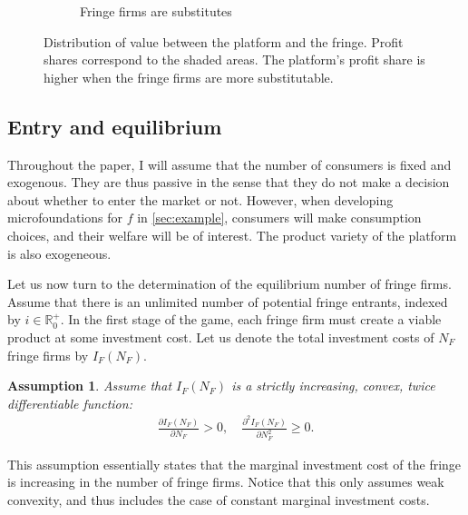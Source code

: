 \documentclass[a4paper]{article}
\newtheorem{assumption}{Assumption}
\begin{document}
\begin{figure}
\begin{subfigure}[b]{0.45\textwidth}
        \caption{Fringe firms are substitutes}
    \end{subfigure}
    \caption{Distribution of value between the platform and the fringe. Profit shares correspond to the shaded areas. The platform's profit share is higher when the fringe firms are more substitutable.}
    \label{fig:outcome_based_bargaining_power}
\end{figure}


\subsection{Entry and equilibrium}

Throughout the paper, I will assume that the number of consumers is fixed and exogenous.
They are thus passive in the sense that they do not make a decision about whether to enter the market or not.
However, when developing microfoundations for $f$ in \cref{sec:example}, consumers will make consumption choices, and their welfare will be of interest.
The product variety of the platform is also exogeneous.

Let us now turn to the determination of the equilibrium number of fringe firms.
Assume that there is an unlimited number of potential fringe entrants, indexed by $i \in \mathbb{R}^+_0$.
In the first stage of the game, each fringe firm must create a viable product at some investment cost.
Let us denote the total investment costs of $N_F$ fringe firms by $I_F(N_F)$.
\begin{assumption}
    Assume that $I_F(N_F)$ is a strictly increasing, convex, twice differentiable function:
    \begin{align*}
        \frac{\partial I_F(N_F)}{\partial N_F} > 0, \quad \frac{\partial^2 I_F(N_F)}{\partial N_F^2} \geq 0.
    \end{align*}
\end{assumption}
This assumption essentially states that the marginal investment cost of the fringe is increasing in the number of fringe firms.
Notice that this only assumes weak convexity, and thus includes the case of constant marginal investment costs.
\end{document}
